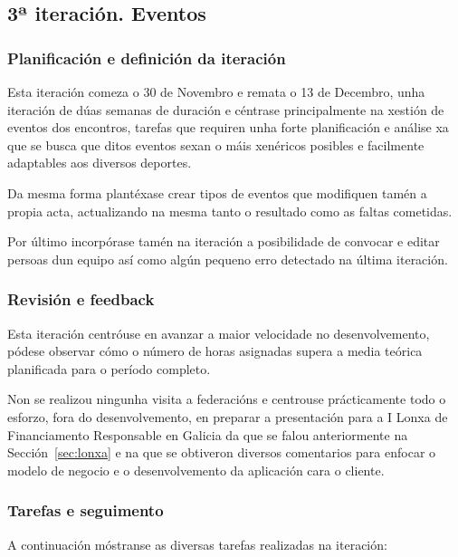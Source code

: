     \subsection{3ª iteración. Eventos}

      \subsubsection{Planificación e definición da iteración}
      Esta iteración comeza o 30 de Novembro e remata o 13 de Decembro, unha 
iteración de dúas semanas de duración e céntrase principalmente na xestión de 
eventos dos encontros, tarefas que requiren unha forte planificación e análise 
xa que se busca que ditos eventos sexan o máis xenéricos posibles e facilmente 
adaptables aos diversos deportes.

      Da mesma forma plantéxase crear tipos de eventos que modifiquen tamén a 
propia acta, actualizando na mesma tanto o resultado como as faltas cometidas.

      Por último incorpórase tamén na iteración a posibilidade de convocar e 
editar persoas dun equipo así como algún pequeno erro detectado na última 
iteración.

      \subsubsection{Revisión e feedback}
      Esta iteración centróuse en avanzar a maior velocidade no 
desenvolvemento, pódese observar cómo o número de horas asignadas supera a 
media teórica planificada para o período completo.

      Non se realizou ningunha visita a federacións e centrouse prácticamente 
todo o esforzo, fora do desenvolvemento, en preparar a presentación para a I 
Lonxa de Financiamento Responsable en Galicia da que se falou 
anteriormente na Sección~\ref{sec:lonxa} e na que se obtiveron diversos 
comentarios para enfocar o modelo de negocio e o desenvolvemento da aplicación 
cara o cliente.

      \subsubsection{Tarefas e seguimento}

      A continuación móstranse as diversas tarefas realizadas na iteración:

